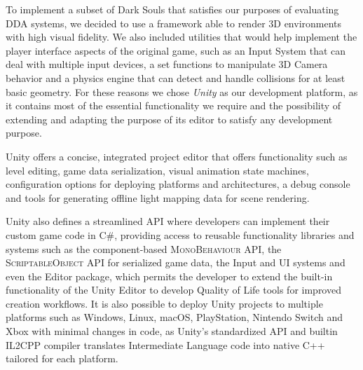 

To implement a subset of Dark Souls that satisfies our purposes of evaluating DDA systems, we decided to use a framework able to render 3D environments with high visual fidelity. We also included utilities that would help implement the player interface aspects of the original game, such as an Input System that can deal with multiple input devices, a set functions to manipulate 3D Camera behavior and a physics engine that can detect and handle collisions for at least basic geometry. For these reasons we chose \emph{Unity} as our development platform, as it contains most of the essential functionality we require and the possibility of extending and adapting the purpose of its editor to satisfy any development purpose.

Unity offers a concise, integrated project editor that offers functionality such as level editing, game data serialization, visual animation state machines, configuration options for deploying platforms and architectures, a debug console and tools for generating offline light mapping data for scene rendering.

Unity also defines a streamlined API where developers can implement their custom game code in \textsc{C\#}, providing access to reusable functionality libraries and systems such as the component-based \textsc{MonoBehaviour} API, the \textsc{ScriptableObject} API for serialized game data, the Input and UI systems and even the Editor package, which permits the developer to extend the built-in functionality of the Unity Editor to develop Quality of Life tools for improved creation workflows. It is also possible to deploy Unity projects to multiple platforms such as Windows, Linux, macOS, PlayStation, Nintendo Switch and Xbox with minimal changes in code, as Unity's standardized API and builtin \textsc{IL2CPP} compiler translates Intermediate Language code into native \textsc{C++} tailored for each platform.

